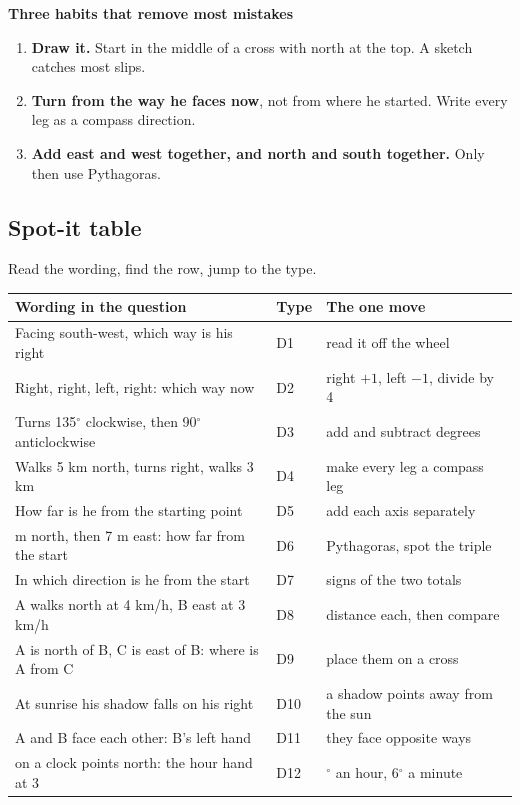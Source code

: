 \documentclass[11pt,a4paper]{article}
\let\oldsubsection\subsection
\renewcommand{\subsection}{\needspace{9\baselineskip}\oldsubsection}
\newcommand{\infobox}[2]{\par\medskip\noindent\begingroup\setlength{\fboxsep}{7pt}%
  \colorbox{codebg}{\parbox{\dimexpr\linewidth-14pt\relax}{\textbf{\color{ember}#1}\par\smallskip #2}}\endgroup\par\medskip}
\begin{document}
\infobox{Three habits that remove most mistakes}{
\begin{enumerate}
\item \textbf{Draw it.} Start in the middle of a cross with north at the top. A sketch catches most slips.
\item \textbf{Turn from the way he faces now}, not from where he started. Write every leg as a compass direction.
\item \textbf{Add east and west together, and north and south together.} Only then use Pythagoras.
\end{enumerate}}

\subsection*{Spot-it table}
Read the wording, find the row, jump to the type.
\begin{center}\small\renewcommand{\arraystretch}{1.18}\setlength{\tabcolsep}{7pt}
\begin{tabularx}{\linewidth}{@{}>{\raggedright\arraybackslash}X l >{\raggedright\arraybackslash}X@{}}
\toprule
\textbf{\color{slate}Wording in the question} & \textbf{\color{slate}Type} & \textbf{\color{slate}The one move} \\ \midrule
Facing south-west, which way is his right & D1 & read it off the wheel \\
Right, right, left, right: which way now & D2 & right $+1$, left $-1$, divide by 4 \\
Turns 135$^\circ$ clockwise, then 90$^\circ$ anticlockwise & D3 & add and subtract degrees \\
Walks 5 km north, turns right, walks 3 km & D4 & make every leg a compass leg \\
How far is he from the starting point & D5 & add each axis separately \\
24 m north, then 7 m east: how far from the start & D6 & Pythagoras, spot the triple \\
In which direction is he from the start & D7 & signs of the two totals \\
A walks north at 4 km/h, B east at 3 km/h & D8 & distance each, then compare \\
A is north of B, C is east of B: where is A from C & D9 & place them on a cross \\
At sunrise his shadow falls on his right & D10 & a shadow points away from the sun \\
A and B face each other: B's left hand & D11 & they face opposite ways \\
12 on a clock points north: the hour hand at 3 & D12 & 30$^\circ$ an hour, 6$^\circ$ a minute \\
\bottomrule
\end{tabularx}\end{center}
\end{document}
